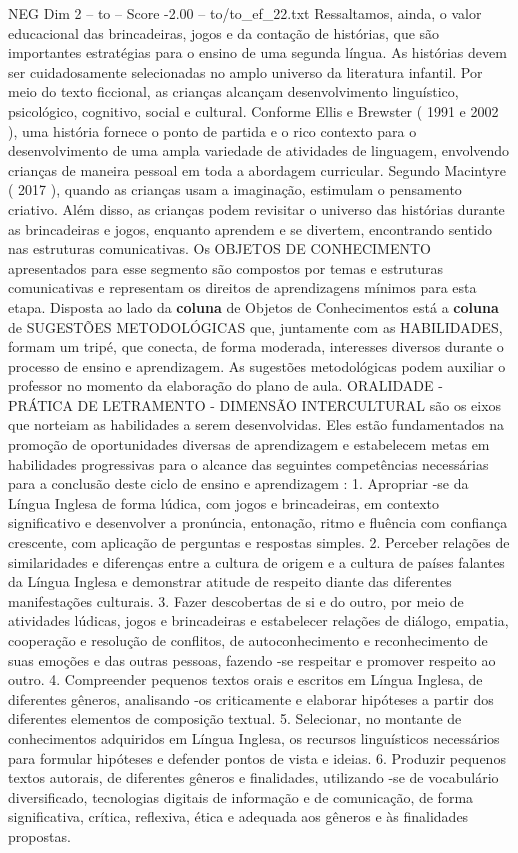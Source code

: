 \begin{textsample}{NEG Dim 2 – to – Score -2.00 – to/to\_ef\_22.txt}
Ressaltamos, ainda, o valor educacional das brincadeiras, jogos e da contação de histórias, que são importantes estratégias para o ensino de uma segunda língua.
As histórias devem ser cuidadosamente selecionadas no amplo universo da literatura infantil.
Por meio do texto ficcional, as crianças alcançam desenvolvimento linguístico, psicológico, cognitivo, social e cultural.
Conforme Ellis e Brewster ( 1991 e 2002 ), uma história fornece o ponto de partida e o rico contexto para o desenvolvimento de uma ampla variedade de atividades de linguagem, envolvendo crianças de maneira pessoal em toda a abordagem curricular.
Segundo Macintyre ( 2017 ), quando as crianças usam a imaginação, estimulam o pensamento criativo.
Além disso, as crianças podem revisitar o universo das histórias durante as brincadeiras e jogos, enquanto aprendem e se divertem, encontrando sentido nas estruturas comunicativas.
Os OBJETOS DE CONHECIMENTO apresentados para esse segmento são compostos por temas e estruturas comunicativas e representam os direitos de aprendizagens mínimos para esta etapa.
Disposta ao lado da \textbf{coluna} de Objetos de Conhecimentos está a \textbf{coluna} de SUGESTÕES METODOLÓGICAS que, juntamente com as HABILIDADES, formam um tripé, que conecta, de forma moderada, interesses diversos durante o processo de ensino e aprendizagem.
As sugestões metodológicas podem auxiliar o professor no momento da elaboração do plano de aula.
ORALIDADE - PRÁTICA DE LETRAMENTO - DIMENSÃO INTERCULTURAL são os eixos que norteiam as habilidades a serem desenvolvidas.
Eles estão fundamentados na promoção de oportunidades diversas de aprendizagem e estabelecem metas em habilidades progressivas para o alcance das seguintes competências necessárias para a conclusão deste ciclo de ensino e aprendizagem : 1.
Apropriar -se da Língua Inglesa de forma lúdica, com jogos e brincadeiras, em contexto significativo e desenvolver a pronúncia, entonação, ritmo e fluência com confiança crescente, com aplicação de perguntas e respostas simples. 2.
Perceber relações de similaridades e diferenças entre a cultura de origem e a cultura de países falantes da Língua Inglesa e demonstrar atitude de respeito diante das diferentes manifestações culturais. 3.
Fazer descobertas de si e do outro, por meio de atividades lúdicas, jogos e brincadeiras e estabelecer relações de diálogo, empatia, cooperação e resolução de conflitos, de autoconhecimento e reconhecimento de suas emoções e das outras pessoas, fazendo -se respeitar e promover respeito ao outro. 4.
Compreender pequenos textos orais e escritos em Língua Inglesa, de diferentes gêneros, analisando -os criticamente e elaborar hipóteses a partir dos diferentes elementos de composição textual. 5.
Selecionar, no montante de conhecimentos adquiridos em Língua Inglesa, os recursos linguísticos necessários para formular hipóteses e defender pontos de vista e ideias. 6.
Produzir pequenos textos autorais, de diferentes gêneros e finalidades, utilizando -se de vocabulário diversificado, tecnologias digitais de informação e de comunicação, de forma significativa, crítica, reflexiva, ética e adequada aos gêneros e às finalidades propostas.

\end{textsample}
